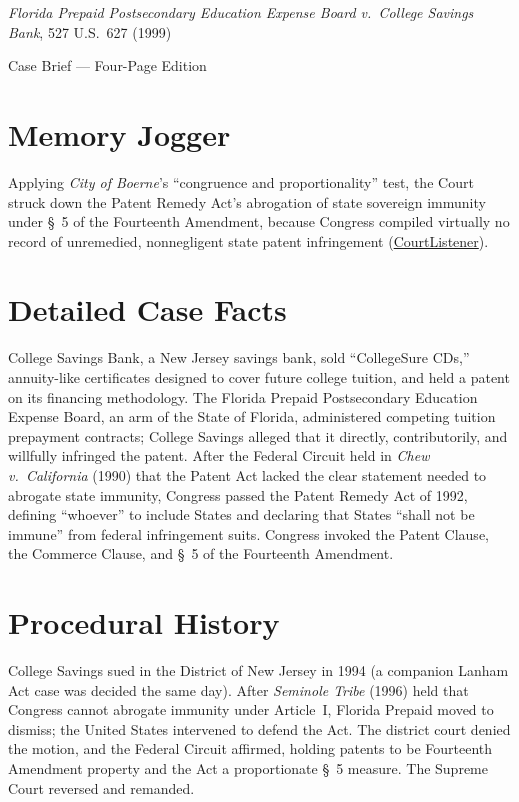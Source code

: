 \documentclass[12pt]{article}
\begin{document}
\begin{center}
{\LARGE \textit{Florida Prepaid Postsecondary Education Expense Board v.\ College Savings Bank}, 527 U.S.\ 627 (1999)\par}
\vspace{0.8em}
{\large Case Brief --- Four-Page Edition\par}
\end{center}
\vspace{1em}

\section{Memory Jogger}

Applying \textit{City of Boerne}'s ``congruence and proportionality'' test, the Court struck down the Patent Remedy Act's abrogation of state sovereign immunity under \S~5 of the Fourteenth Amendment, because Congress compiled virtually no record of unremedied, nonnegligent state patent infringement (\href{https://www.courtlistener.com/opinion/118316/florida-prepaid-postsecondary-education-expense-board-v-college-savings/}{CourtListener}).

\section{Detailed Case Facts}

College Savings Bank, a New Jersey savings bank, sold ``CollegeSure CDs,'' annuity-like certificates designed to cover future college tuition, and held a patent on its financing methodology. The Florida Prepaid Postsecondary Education Expense Board, an arm of the State of Florida, administered competing tuition prepayment contracts; College Savings alleged that it directly, contributorily, and willfully infringed the patent. After the Federal Circuit held in \textit{Chew v.\ California} (1990) that the Patent Act lacked the clear statement needed to abrogate state immunity, Congress passed the Patent Remedy Act of 1992, defining ``whoever'' to include States and declaring that States ``shall not be immune'' from federal infringement suits. Congress invoked the Patent Clause, the Commerce Clause, and \S~5 of the Fourteenth Amendment.

\section{Procedural History}

College Savings sued in the District of New Jersey in 1994 (a companion Lanham Act case was decided the same day). After \textit{Seminole Tribe} (1996) held that Congress cannot abrogate immunity under Article~I, Florida Prepaid moved to dismiss; the United States intervened to defend the Act. The district court denied the motion, and the Federal Circuit affirmed, holding patents to be Fourteenth Amendment property and the Act a proportionate \S~5 measure. The Supreme Court reversed and remanded.
\end{document}

